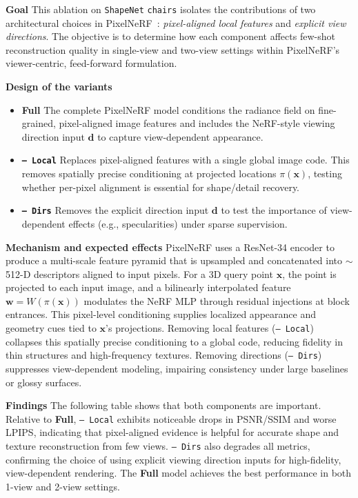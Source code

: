 \begin{enrichment}
\begin{enrichment}
     \textbf{Goal} \;
     This ablation on \texttt{ShapeNet} \texttt{chairs} isolates the contributions of two architectural choices in PixelNeRF~\cite{yu2020_pixelnerf}: \emph{pixel-aligned local features} and \emph{explicit view directions}. The objective is to determine how each component affects few-shot reconstruction quality in single-view and two-view settings within PixelNeRF’s viewer-centric, feed-forward formulation.
     
     \textbf{Design of the variants} \;
     \begin{itemize}
         \item \textbf{Full} \; The complete PixelNeRF model conditions the radiance field on fine-grained, pixel-aligned image features and includes the NeRF-style viewing direction input $\mathbf{d}$ to capture view-dependent appearance.
         \item \textbf{\texttt{-- Local}} \; Replaces pixel-aligned features with a single global image code. This removes spatially precise conditioning at projected locations $\pi(\mathbf{x})$, testing whether per-pixel alignment is essential for shape/detail recovery.
         \item \textbf{\texttt{-- Dirs}} \; Removes the explicit direction input $\mathbf{d}$ to test the importance of view-dependent effects (e.g., specularities) under sparse supervision.
     \end{itemize}
     
     \textbf{Mechanism and expected effects} \;
     PixelNeRF uses a ResNet-34 encoder to produce a multi-scale feature pyramid that is upsampled and concatenated into $\sim$512-D descriptors aligned to input pixels. For a 3D query point $\mathbf{x}$, the point is projected to each input image, and a bilinearly interpolated feature $\mathbf{w}=W(\pi(\mathbf{x}))$ modulates the NeRF MLP through residual injections at block entrances. This pixel-level conditioning supplies localized appearance and geometry cues tied to $\mathbf{x}$’s projections. Removing local features (\texttt{-- Local}) collapses this spatially precise conditioning to a global code, reducing fidelity in thin structures and high-frequency textures. Removing directions (\texttt{-- Dirs}) suppresses view-dependent modeling, impairing consistency under large baselines or glossy surfaces.
     
     \textbf{Findings} \;
     The following table shows that both components are important. Relative to \textbf{Full}, \texttt{-- Local} exhibits noticeable drops in PSNR/SSIM and worse LPIPS, indicating that pixel-aligned evidence is helpful for accurate shape and texture reconstruction from few views. \texttt{-- Dirs} also degrades all metrics, confirming the choice of using explicit viewing direction inputs for high-fidelity, view-dependent rendering. The \textbf{Full} model achieves the best performance in both 1-view and 2-view settings.
     

\end{enrichment}
\end{enrichment}
